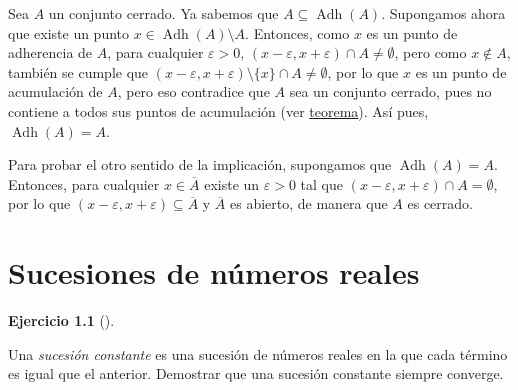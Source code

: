 \documentclass[
  spanish,
  a4paper,
]{scrreport}
\theoremstyle{definition}
\newtheorem{exercise}{Ejercicio}[chapter]
\theoremstyle{remark}
\begin{document}
\begin{tcolorbox}[enhanced jigsaw, arc=.35mm, bottomrule=.15mm, bottomtitle=1mm, breakable, colback=white, colbacktitle=quarto-callout-tip-color!10!white, colframe=quarto-callout-tip-color-frame, coltitle=black, left=2mm, leftrule=.75mm, opacityback=0, opacitybacktitle=0.6, rightrule=.15mm, title=\textcolor{quarto-callout-tip-color}{\faLightbulb}\hspace{0.5em}{Solución}, titlerule=0mm, toprule=.15mm, toptitle=1mm]

Sea \(A\) un conjunto cerrado. Ya sabemos que
\(A\subseteq \operatorname{Adh}(A)\). Supongamos ahora que existe un
punto \(x\in \operatorname{Adh}(A)\setminus A\). Entonces, como \(x\) es
un punto de adherencia de \(A\), para cualquier \(\varepsilon>0\),
\((x-\varepsilon,x+\varepsilon)\cap A\neq \emptyset\), pero como
\(x\not\in A\), también se cumple que
\((x-\varepsilon,x+\varepsilon)\setminus \{x\}\cap A\neq \emptyset\),
por lo que \(x\) es un punto de acumulación de \(A\), pero eso
contradice que \(A\) sea un conjunto cerrado, pues no contiene a todos
sus puntos de acumulación (ver
\href{https://aprendeconalf.es/analisis-manual/topologia-reales.html\#thm-conjunto-cerrado-puntos-acumulacion}{teorema}).
Así pues, \(\operatorname{Adh}(A)=A\).

Para probar el otro sentido de la implicación, supongamos que
\(\operatorname{Adh}(A)=A\). Entonces, para cualquier
\(x\in \overline{A}\) existe un \(\varepsilon>0\) tal que
\((x-\varepsilon,x+\varepsilon)\cap A=\emptyset\), por lo que
\((x-\varepsilon,x+\varepsilon)\subseteq \overline{A}\) y
\(\overline{A}\) es abierto, de manera que \(A\) es cerrado.

\end{tcolorbox}


\chapter{Sucesiones de números
reales}\label{sucesiones-de-nuxfameros-reales}

\begin{exercise}[]\protect\hypertarget{exr-sucesion-constante}{}\label{exr-sucesion-constante}

Una \emph{sucesión constante} es una sucesión de números reales en la
que cada término es igual que el anterior. Demostrar que una sucesión
constante siempre converge.

\end{exercise}
\end{document}
